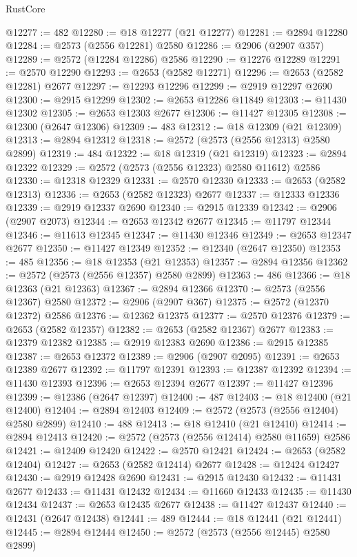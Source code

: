 \begin{lexlean}{RustCore}
\begin{coremodule}
@12277 := 482
@12280 := @18 @12277 (@21 @12277)
@12281 := @2894 @12280
@12284 := @2573 (@2556 @12281) @2580
@12286 := @2906 (@2907 @357)
@12289 := @2572 (@12284 @12286) @2586
@12290 := @12276 @12289
@12291 := @2570 @12290
@12293 := @2653 (@2582 @12271)
@12296 := @2653 (@2582 @12281) @2677
@12297 := @12293 @12296
@12299 := @2919 @12297 @2690
@12300 := @2915 @12299
@12302 := @2653 @12286 @11849
@12303 := @11430 @12302
@12305 := @2653 @12303 @2677
@12306 := @11427 @12305
@12308 := @12300 (@2647 @12306)
@12309 := 483
@12312 := @18 @12309 (@21 @12309)
@12313 := @2894 @12312
@12318 := @2572 (@2573 (@2556 @12313) @2580 @2899)
@12319 := 484
@12322 := @18 @12319 (@21 @12319)
@12323 := @2894 @12322
@12329 := @2572 (@2573 (@2556 @12323) @2580 @11612) @2586
@12330 := @12318 @12329
@12331 := @2570 @12330
@12333 := @2653 (@2582 @12313)
@12336 := @2653 (@2582 @12323) @2677
@12337 := @12333 @12336
@12339 := @2919 @12337 @2690
@12340 := @2915 @12339
@12342 := @2906 (@2907 @2073)
@12344 := @2653 @12342 @2677
@12345 := @11797 @12344
@12346 := @11613 @12345
@12347 := @11430 @12346
@12349 := @2653 @12347 @2677
@12350 := @11427 @12349
@12352 := @12340 (@2647 @12350)
@12353 := 485
@12356 := @18 @12353 (@21 @12353)
@12357 := @2894 @12356
@12362 := @2572 (@2573 (@2556 @12357) @2580 @2899)
@12363 := 486
@12366 := @18 @12363 (@21 @12363)
@12367 := @2894 @12366
@12370 := @2573 (@2556 @12367) @2580
@12372 := @2906 (@2907 @367)
@12375 := @2572 (@12370 @12372) @2586
@12376 := @12362 @12375
@12377 := @2570 @12376
@12379 := @2653 (@2582 @12357)
@12382 := @2653 (@2582 @12367) @2677
@12383 := @12379 @12382
@12385 := @2919 @12383 @2690
@12386 := @2915 @12385
@12387 := @2653 @12372
@12389 := @2906 (@2907 @2095)
@12391 := @2653 @12389 @2677
@12392 := @11797 @12391
@12393 := @12387 @12392
@12394 := @11430 @12393
@12396 := @2653 @12394 @2677
@12397 := @11427 @12396
@12399 := @12386 (@2647 @12397)
@12400 := 487
@12403 := @18 @12400 (@21 @12400)
@12404 := @2894 @12403
@12409 := @2572 (@2573 (@2556 @12404) @2580 @2899)
@12410 := 488
@12413 := @18 @12410 (@21 @12410)
@12414 := @2894 @12413
@12420 := @2572 (@2573 (@2556 @12414) @2580 @11659) @2586
@12421 := @12409 @12420
@12422 := @2570 @12421
@12424 := @2653 (@2582 @12404)
@12427 := @2653 (@2582 @12414) @2677
@12428 := @12424 @12427
@12430 := @2919 @12428 @2690
@12431 := @2915 @12430
@12432 := @11431 @2677
@12433 := @11431 @12432
@12434 := @11660 @12433
@12435 := @11430 @12434
@12437 := @2653 @12435 @2677
@12438 := @11427 @12437
@12440 := @12431 (@2647 @12438)
@12441 := 489
@12444 := @18 @12441 (@21 @12441)
@12445 := @2894 @12444
@12450 := @2572 (@2573 (@2556 @12445) @2580 @2899)

\end{coremodule}
\end{lexlean}
